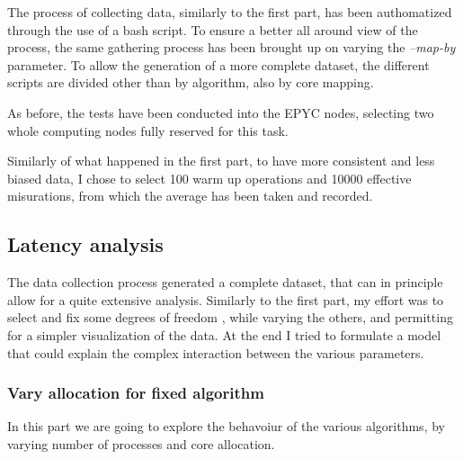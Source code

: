 \documentclass{article}
\begin{document}
	The process of collecting data, similarly to the first part, has been authomatized through the use of a bash script. To ensure a better all around view of the process, the same gathering process has been brought up on varying the \textit{--map-by} parameter. To allow the generation of a more complete dataset, the different scripts are divided other than by algorithm, also by core mapping.
	
	As before, the tests have been conducted into the EPYC nodes, selecting two whole computing nodes fully reserved for this task.
	
	Similarly of what happened in the first part, to have more consistent and less biased data, I chose to select 100 warm up operations and 10000 effective misurations, from which the average has been taken and recorded.
	
	\subsection{Latency analysis}
	
	The data collection process generated a complete dataset, that can in principle allow for a quite extensive analysis. Similarly to the first part, my effort was to select and fix some degrees of freedom , while varying the others, and permitting for a simpler visualization of the data.
	At the end I tried to formulate a model that could explain the complex interaction between the various parameters.
	
	\subsubsection{Vary allocation for fixed algorithm}
	
	In this part we are going to explore the behavoiur of the various algorithms, by varying number of processes and core allocation.
	
	
\end{document}
